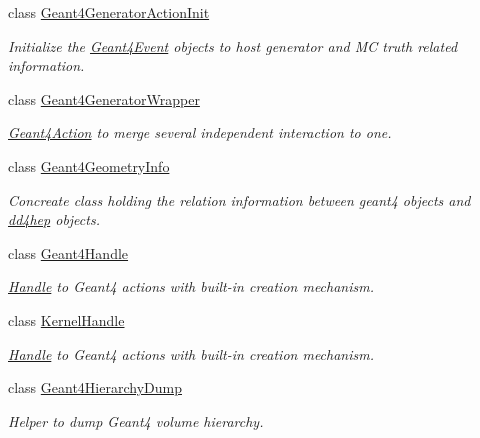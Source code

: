 \begin{DoxyCompactItemize}
class \hyperlink{class_d_d4hep_1_1_simulation_1_1_geant4_generator_action_init}{Geant4GeneratorActionInit}
\begin{DoxyCompactList}\small\item\em Initialize the \hyperlink{class_d_d4hep_1_1_simulation_1_1_geant4_event}{Geant4Event} objects to host generator and MC truth related information. \item\end{DoxyCompactList}\item 
class \hyperlink{class_d_d4hep_1_1_simulation_1_1_geant4_generator_wrapper}{Geant4GeneratorWrapper}
\begin{DoxyCompactList}\small\item\em \hyperlink{class_d_d4hep_1_1_simulation_1_1_geant4_action}{Geant4Action} to merge several independent interaction to one. \item\end{DoxyCompactList}\item 
class \hyperlink{class_d_d4hep_1_1_simulation_1_1_geant4_geometry_info}{Geant4GeometryInfo}
\begin{DoxyCompactList}\small\item\em Concreate class holding the relation information between geant4 objects and \hyperlink{namespacedd4hep}{dd4hep} objects. \item\end{DoxyCompactList}\item 
class \hyperlink{class_d_d4hep_1_1_simulation_1_1_geant4_handle}{Geant4Handle}
\begin{DoxyCompactList}\small\item\em \hyperlink{class_d_d4hep_1_1_handle}{Handle} to Geant4 actions with built-\/in creation mechanism. \item\end{DoxyCompactList}\item 
class \hyperlink{class_d_d4hep_1_1_simulation_1_1_kernel_handle}{KernelHandle}
\begin{DoxyCompactList}\small\item\em \hyperlink{class_d_d4hep_1_1_handle}{Handle} to Geant4 actions with built-\/in creation mechanism. \item\end{DoxyCompactList}\item 
class \hyperlink{class_d_d4hep_1_1_simulation_1_1_geant4_hierarchy_dump}{Geant4HierarchyDump}
\begin{DoxyCompactList}\small\item\em Helper to dump Geant4 volume hierarchy. \item\end{DoxyCompactList}\item 

\end{DoxyCompactItemize}
